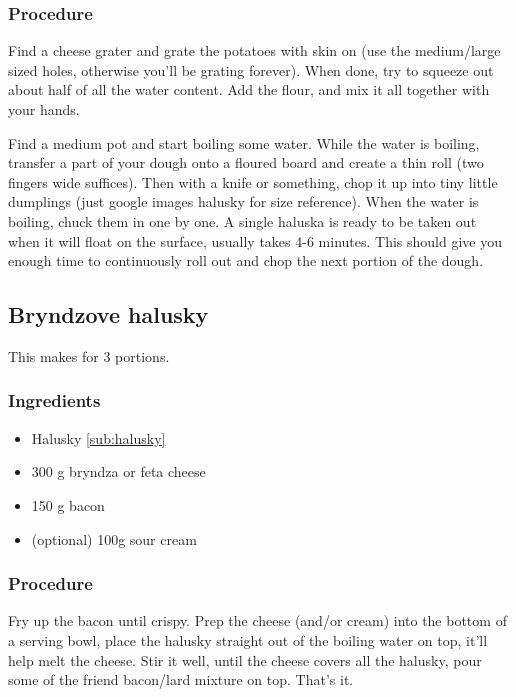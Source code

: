 \documentclass[10pt]{article}
\begin{document}
\subsubsection{Procedure}%
\label{ssub:halusky_procedure}


Find a cheese grater and grate the potatoes with skin on (use the medium/large sized holes, otherwise you'll be grating forever). When done, try to squeeze out about half of all the water content. Add the flour, and mix it all together with your hands.\par

Find a medium pot and start boiling some water. While the water is boiling, transfer a part of your dough onto a floured board and create a thin roll (two fingers wide suffices). Then with a knife or something, chop it up into tiny little dumplings (just google images halusky for size reference). When the water is boiling, chuck them in one by one. A single haluska is ready to be taken out when it will float on the surface, usually takes 4-6 minutes. This should give you enough time to continuously roll out and chop the next portion of the dough.\par

\subsection{Bryndzove halusky}%
This makes for 3 portions.
\label{sub:bryndzove_halusky}
\subsubsection{Ingredients}%
\label{ssub:bryndzove_halusky_ingredients}
\begin{itemize}
	\item Halusky \ref{sub:halusky}
	\item 300 g bryndza or feta cheese
	\item 150 g bacon 
	\item (optional) 100g sour cream
\end{itemize}
\subsubsection{Procedure}%
\label{ssub:bryndzove_halusky_procedure}
Fry up the bacon until crispy. Prep the cheese (and/or cream) into the bottom of a serving bowl, place the halusky straight out of the boiling water on top, it'll help melt the cheese. Stir it well, until the cheese covers all the halusky, pour some of the friend bacon/lard mixture on top. That's it.
\end{document}
